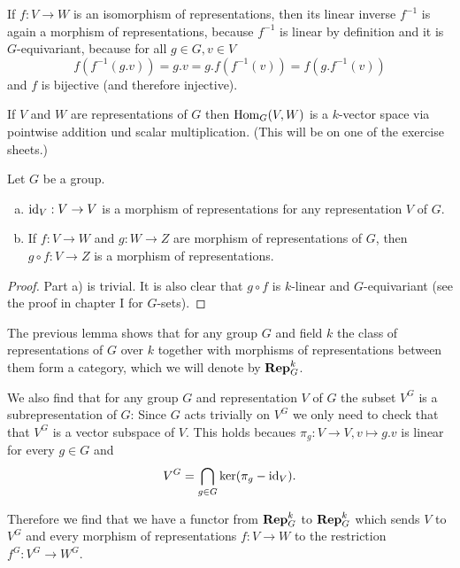 \begin{rem}
 If $f : V \to W$ is an isomorphism of representations, then its linear inverse $f^{-1}$ is again a morphism of representations, because $f^{-1}$ is linear by definition and it is $G$-equivariant, because for all $g \in G, v \in V$
 \[
  f\left(f^{-1}(g.v)\right) = g.v = g.f\left(f^{-1}(v)\right) = f\left(g.f^{-1}(v)\right)
 \]
 and $f$ is bijective (and therefore injective).
\end{rem}


\begin{rem}
 If $V$ and $W$ are representations of $G$ then $\operatorname{Hom}_G(V,W)$ is a $k$-vector space via pointwise addition und scalar multiplication. (This will be on one of the exercise sheets.)
\end{rem}


\begin{lem}\label{lem: composition of morphisms of representations}
 Let $G$ be a group.
 \begin{enumerate}[a)]
  \item
  $\operatorname{id}_V : V \to V$ is a morphism of representations for any representation $V$ of $G$.
  \item
  If $f : V \to W$  and $g : W \to Z$ are morphism of representations of $G$, then $g \circ f : V \to Z$ is a morphism of representations.
 \end{enumerate}
\end{lem}
\begin{proof}
 Part a) is trivial. It is also clear that $g \circ f$ is $k$-linear and $G$-equivariant (see the proof in chapter I for $G$-sets).
\end{proof}


The previous lemma shows that for any group $G$ and field $k$ the class of representations of $G$ over $k$ together with morphisms of representations between them form a category, which we will denote by $\mathbf{Rep}^k_G$.


We also find that for any group $G$ and representation $V$ of $G$ the subset $V^G$ is a subrepresentation of $G$: Since $G$ acts trivially on $V^G$ we only need to check that that $V^G$ is a vector subspace of $V$. This holds becaues $\pi_g : V \to V, v \mapsto g.v$ is linear for every $g \in G$ and
\[
 V^G = \bigcap_{g \in G} \ker(\pi_g - \operatorname{id}_V).
\]

Therefore we find that we have a functor from $\mathbf{Rep}^k_G$ to $\mathbf{Rep}^k_G$ which sends $V$ to $V^G$ and every morphism of representations $f : V \to W$ to the restriction $f^G : V^G \to W^G$.


